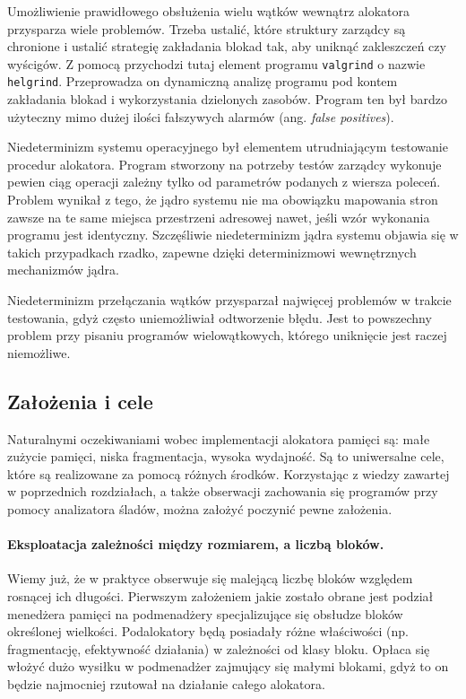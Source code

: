 \documentclass[12pt,a4paper,titlepage,twoside]{mwart}
\begin{document}
Umożliwienie prawidłowego obsłużenia wielu wątków wewnątrz alokatora przysparza
wiele problemów. Trzeba ustalić, które struktury zarządcy są chronione i
ustalić strategię zakładania blokad tak, aby uniknąć zakleszczeń czy wyścigów.
Z pomocą przychodzi tutaj element programu \verb+valgrind+ o nazwie
\verb+helgrind+. Przeprowadza on dynamiczną analizę programu pod kontem
zakładania blokad i wykorzystania dzielonych zasobów. Program ten był bardzo
użyteczny mimo dużej ilości fałszywych alarmów (ang. \textit{false positives}).

Niedeterminizm systemu operacyjnego był elementem utrudniającym testowanie
procedur alokatora. Program stworzony na potrzeby testów zarządcy wykonuje
pewien ciąg operacji zależny tylko od parametrów podanych z wiersza poleceń.
Problem wynikał z tego, że jądro systemu nie ma obowiązku mapowania stron
zawsze na te same miejsca przestrzeni adresowej nawet, jeśli wzór wykonania
programu jest identyczny.  Szczęśliwie niedeterminizm jądra systemu objawia się
w takich przypadkach rzadko, zapewne dzięki determinizmowi wewnętrznych
mechanizmów jądra.
	
Niedeterminizm przełączania wątków przysparzał najwięcej problemów w trakcie
testowania, gdyż często uniemożliwiał odtworzenie błędu. Jest to powszechny
problem przy pisaniu programów wielowątkowych, którego uniknięcie jest raczej
niemożliwe.

\subsection{Założenia i cele}

Naturalnymi oczekiwaniami wobec implementacji alokatora pamięci są: małe
zużycie pamięci, niska fragmentacja, wysoka wydajność. Są to uniwersalne cele,
które są realizowane za pomocą różnych środków. Korzystając z wiedzy zawartej w
poprzednich rozdziałach, a także obserwacji zachowania się programów przy
pomocy analizatora śladów, można założyć poczynić pewne założenia.

\paragraph{Eksploatacja zależności między rozmiarem, a liczbą bloków.} Wiemy
już, że w praktyce obserwuje się malejącą liczbę bloków względem rosnącej ich
długości. Pierwszym założeniem jakie zostało obrane jest podział menedżera
pamięci na podmenadżery specjalizujące się obsłudze bloków określonej
wielkości. Podalokatory będą posiadały różne właściwości (np. fragmentację,
efektywność działania) w zależności od klasy bloku. Opłaca się włożyć dużo
wysiłku w podmenadżer zajmujący się małymi blokami, gdyż to on będzie
najmocniej rzutował na działanie całego alokatora.
\end{document}
